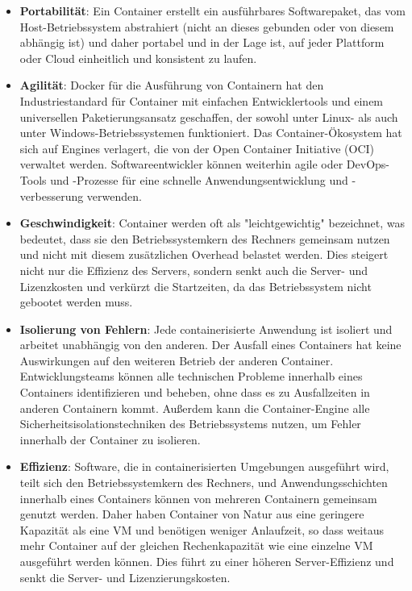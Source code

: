 \begin{itemize}
    \setlength\itemsep{1em}
    \item[] \textbf{Portabilität}: Ein Container erstellt ein ausführbares
    Softwarepaket, das vom Host-Betriebssystem abstrahiert
    (nicht an dieses gebunden oder von diesem abhängig ist)
    und daher portabel und in der Lage ist, auf jeder Plattform oder
    Cloud einheitlich und konsistent zu laufen.

    \item[] \textbf{Agilität}: Docker für die Ausführung von Containern hat den
    Industriestandard für Container mit einfachen Entwicklertools
    und einem universellen Paketierungsansatz geschaffen, der sowohl
    unter Linux- als auch unter Windows-Betriebssystemen funktioniert.
    Das Container-Ökosystem hat sich auf Engines verlagert, die von
    der Open Container Initiative (OCI) verwaltet werden.
    Softwareentwickler können weiterhin agile oder DevOps-Tools
    und -Prozesse für eine schnelle Anwendungsentwicklung und
    -verbesserung verwenden.

    \item[] \textbf{Geschwindigkeit}: Container werden oft als "leichtgewichtig"
    bezeichnet, was bedeutet, dass sie den Betriebssystemkern des
    Rechners gemeinsam nutzen und nicht mit diesem zusätzlichen
    Overhead belastet werden. Dies steigert nicht nur die Effizienz
    des Servers, sondern senkt auch die Server- und Lizenzkosten und
    verkürzt die Startzeiten, da das Betriebssystem nicht gebootet
    werden muss.

    \item[] \textbf{Isolierung von Fehlern}: Jede containerisierte Anwendung ist
    isoliert und arbeitet unabhängig von den anderen. Der Ausfall
    eines Containers hat keine Auswirkungen auf den weiteren Betrieb
    der anderen Container. Entwicklungsteams können alle technischen
    Probleme innerhalb eines Containers identifizieren und beheben,
    ohne dass es zu Ausfallzeiten in anderen Containern kommt.
    Außerdem kann die Container-Engine alle
    Sicherheitsisolationstechniken des Betriebssystems nutzen, um Fehler innerhalb der
    Container zu isolieren.

    \item[] \textbf{Effizienz}: Software, die in containerisierten Umgebungen
    ausgeführt wird, teilt sich den Betriebssystemkern des Rechners,
    und Anwendungsschichten innerhalb eines Containers können von
    mehreren Containern gemeinsam genutzt werden. Daher haben
    Container von Natur aus eine geringere Kapazität als eine VM
    und benötigen weniger Anlaufzeit, so dass weitaus mehr Container
    auf der gleichen Rechenkapazität wie eine einzelne VM ausgeführt
    werden können. Dies führt zu einer höheren Server-Effizienz und
    senkt die Server- und Lizenzierungskosten.


\end{itemize}
